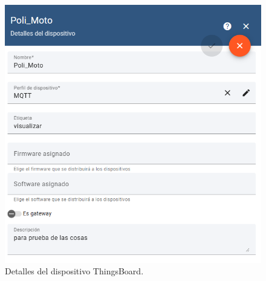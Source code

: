 \begin{figure}[H]
\leavevmode
\begin{minipage}{\textwidth}
\begin{center}
\includegraphics[scale=0.53]{./capitulo_04/imagen/tb/dispositivo.png}
\caption{Detalles del dispositivo ThingsBoard. \label{fig:tbdisp}}
\end{center}
\end{minipage}
\end{figure}

